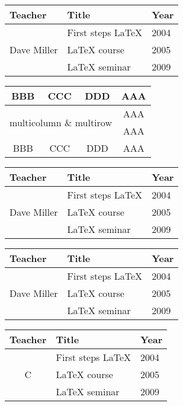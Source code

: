 \documentclass{article}
\begin{document}
\centering
\begin{tabular}{|l|l|l|}
\hline
Teacher & Title & Year \\
\hline
\hline
\multirow{3}{*}{Dave Miller} & First steps \LaTeX{} & 2004 \\
 & \LaTeX{} course & 2005 \\
 & \LaTeX{} seminar & 2009 \\
\hline
\end{tabular}

\vspace{1,5cm}
\begin{tabular}{|ccc|c|}
\hline
BBB & CCC & DDD & AAA\\
\hline
\multicolumn{3}{|c|}{\multirow{2}{*}{multicolumn \& multirow}}& 
AAA \\ \cline{4-4}
& & & AAA \\
\hline
BBB & CCC & DDD & AAA\\
\hline
\end{tabular}

\vspace{1,5cm}
\begin{tabular}{|l|l|l|}
\hline
Teacher & Title & Year \\
\hline
\hline
\multirow{3}{*}{Dave Miller} & First steps \LaTeX{} & 2004 \\ \cline{2-3}
 & \LaTeX{} course & 2005 \\ \cline{2-3}
 & \LaTeX{} seminar & 2009 \\ 
\hline
\end{tabular}

\vspace{1,5cm}
\begin{tabular}{lll}
\toprule
Teacher & Title & Year \\
\midrule
\multirow{3}{*}{Dave Miller} & First steps \LaTeX{} & 2004 \\ 
 & \LaTeX{} course & 2005 \\ 
 & \LaTeX{} seminar & 2009 \\ 
\bottomrule
\end{tabular}



\vspace{1,5cm}
\begin{tabular}{lll}
\toprule
Teacher & Title & Year \\
\midrule
\multicolumn{1}{c}{\multirow{3}{*}{C}} & First steps \LaTeX{} & 2004 \\ 
 & \LaTeX{} course & 2005 \\ 
 & \LaTeX{} seminar & 2009 \\ 
\bottomrule
\end{tabular}
\end{document}
